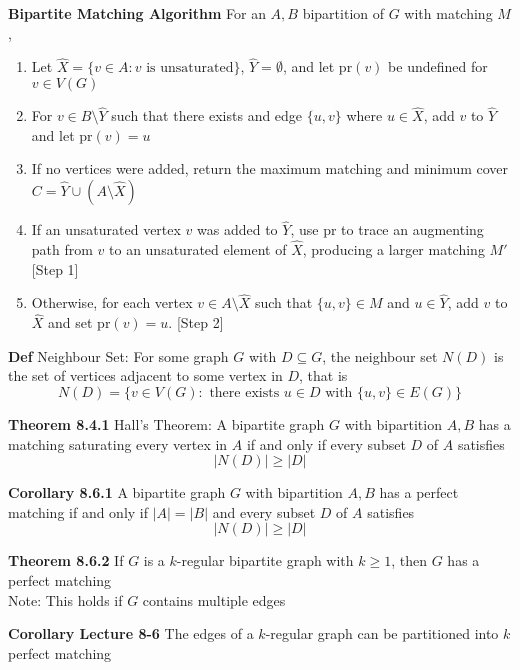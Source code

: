 \documentclass[11pt,notitlepage]{report}
\newcommand{\tbf}[1]{\textbf{#1}}
\begin{document}
\newpage
\tbf{Bipartite Matching Algorithm} For an $A, B$ bipartition of $G$ with matching $M$,
\vspace{-4mm}
\begin{enumerate}[label=(Step \arabic*)]
    \item Let $\hat{X} = \{v \in A : v \text{ is unsaturated}\}$, $\hat{Y} = \emptyset$, and let pr$(v)$ be undefined for $v \in V(G)$
    \vspace{-6mm}
    \item For $v \in B \setminus \hat{Y}$ such that there exists and edge $\{u,v\}$ where $u \in \hat{X}$, add $v$ to $\hat{Y}$ and let pr$(v) = u$
    \vspace{-1mm}
    \item If no vertices were added, return the maximum matching and minimum cover $C = \hat{Y} \cup (A \setminus \hat{X})$
    \vspace{-1mm}
    \item If an unsaturated vertex $v$ was added to $\hat{Y}$, use pr to trace an augmenting path from $v$ to an unsaturated element of $\hat{X}$, producing a larger matching $M'$ [Step 1]
    \vspace{-1mm}
    \item Otherwise, for each vertex $v \in A \setminus \hat{X}$ such that $\{u,v\} \in M$ and $u \in \hat{Y}$, add $v$ to $\hat{X}$ and set pr$(v) = u$. [Step 2]
\end{enumerate}
\vspace{-3mm}

\tbf{Def} Neighbour Set: For some graph $G$ with $D \subseteq G$, the neighbour set $N(D)$ is the set of vertices adjacent to some vertex in $D$, that is
$$N(D) = \{v \in V(G) : \text{ there exists }u \in D \text{ with } \{u,v\}\in E(G)\}$$

\tbf{Theorem 8.4.1} Hall's Theorem: A bipartite graph $G$ with bipartition $A, B$ has a matching saturating every vertex in $A$ if and only if every subset $D$ of $A$ satisfies
$$|N(D)| \geq |D|$$

\tbf{Corollary 8.6.1}  A bipartite graph $G$ with bipartition $A, B$ has a perfect matching if and only if $|A| = |B|$ and every subset $D$ of $A$ satisfies
$$|N(D)| \geq |D|$$

\tbf{Theorem 8.6.2} If $G$ is a $k$-regular bipartite graph with $k \geq 1$, then $G$ has a perfect matching \\
\hspace*{5mm} Note: This holds if $G$ contains multiple edges

\tbf{Corollary Lecture 8-6} The edges of a $k$-regular graph can be partitioned into $k$ perfect matching
\end{document}
